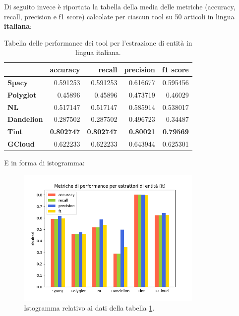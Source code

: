 \documentclass[a4paper,11pt]{article}
\begin{document}
\clearpage
Di seguito invece è riportata la tabella della media delle metriche (accuracy, recall, precision e f1 score) calcolate per ciascun tool su 50 articoli in lingua \textbf{italiana}:

\begin{table}[H]
\centering
{\renewcommand{\arraystretch}{1.35}%
\begin{tabular}{|l|r|r|r|r|}
\hline
{} &  \textbf{accuracy} & \textbf{recall} & \textbf{precision} & \textbf{f1 score} \\\hline
\textbf{Spacy    } &  0.591253 &  0.591253 &  0.616677 &  0.595456 \\\hline
\textbf{Polyglot } &   0.45896 &   0.45896 &  0.473719 &   0.46029 \\\hline
\textbf{NL       } &  0.517147 &  0.517147 &  0.585914 &  0.538017 \\\hline
\textbf{Dandelion} &  0.287502 &  0.287502 &  0.496723 &   0.34487 \\\hline
\textbf{Tint     } &  \textbf{0.802747} &  \textbf{0.802747} &   \textbf{0.80021} &   \textbf{0.79569} \\\hline
\textbf{GCloud   } &  0.622233 &  0.622233 &  0.643944 &  0.625301 \\
\hline
\end{tabular}}
\caption{\label{tab:it-results}Tabella delle performance dei tool per l'estrazione di entità in lingua italiana.}
\end{table}

E in forma di istogramma:
\begin{figure}[H]
\centering
\includegraphics[width=0.8\textwidth]{img/results-it}
\vspace*{-5mm}
\caption{Istogramma relativo ai dati della tabella \ref{tab:it-results}.}
\label{fig:results-it}
\end{figure}
\end{document}
